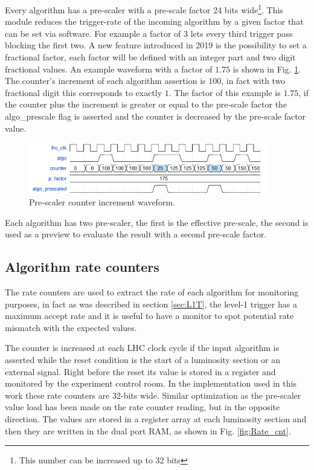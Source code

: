 \documentclass[../../main.tex]{subfiles}
\begin{document}
Every algorithm has a pre-scaler with a pre-scale factor 24 bits wide\footnote{This number can be increased up to 32 bits}. This module reduces the trigger-rate of the incoming algorithm by a given factor that can be set via software. For example a factor of 3 lets every third trigger pass blocking the first two.\newline 
A new feature introduced in 2019 is the possibility to set a fractional factor, each factor will be defined with an integer part and two digit fractional values. An example waveform with a factor of $1.75$ is shown in Fig. \ref{fig:prescaler}.\newline
The counter's increment of each algorithm assertion is $100$, in fact with two fractional digit this corresponds to exactly $1$. The factor of this example is $1.75$, if the counter plus the increment is greater or equal to the pre-scale factor the algo\_prescale flag is asserted and the counter is decreased by the pre-scale factor value.


\begin{figure}[h]
    \centering
    \includegraphics[width=0.93\textwidth]{sections/06/Images/Prescaler_wf_1.pdf}
    \caption{Pre-scaler counter increment waveform.}
    \label{fig:prescaler}
\end{figure}

Each algorithm has two pre-scaler, the first is the effective pre-scale, the second is used as a preview to evaluate the result with a second pre-scale factor.

\subsection{Algorithm rate counters}
\label{sec:Finor_ratecnt}

The rate counters are used to extract the rate of each algorithm for monitoring purposes, in fact as was described in section \ref{sec:L1T}, the level-1 trigger has a maximum accept rate and it is useful to have a monitor to spot potential rate mismatch with the expected values. 

The counter is increased at each LHC clock cycle if the input algorithm is asserted while the reset condition is the start of a luminosity section or an external signal. Right before the reset its value is stored in a register and monitored by the experiment control room. In the implementation used in this work these rate counters are 32-bits wide. \newline
Similar optimization as the pre-scaler value load has been made on the rate counter reading, but in the opposite direction. The values are stored in a register array at each luminosity section and then they are written in the dual port RAM, as shown in Fig. \ref{fig:Rate_cnt}.
\end{document}

